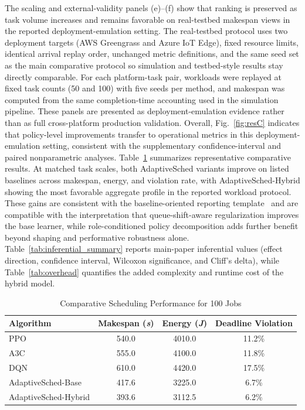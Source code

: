 \documentclass[journal]{IEEEtran}
\begin{document}
The scaling and external-validity panels (e)--(f) show that ranking is preserved as task volume increases and remains favorable on real-testbed makespan views in the reported deployment-emulation setting. The real-testbed protocol uses two deployment targets (AWS Greengrass and Azure IoT Edge), fixed resource limits, identical arrival replay order, unchanged metric definitions, and the same seed set as the main comparative protocol so simulation and testbed-style results stay directly comparable. For each platform-task pair, workloads were replayed at fixed task counts (50 and 100) with five seeds per method, and makespan was computed from the same completion-time accounting used in the simulation pipeline. These panels are presented as deployment-emulation evidence rather than as full cross-platform production validation. Overall, Fig.~\ref{fig:resC} indicates that policy-level improvements transfer to operational metrics in this deployment-emulation setting, consistent with the supplementary confidence-interval and paired nonparametric analyses.
Table~\ref{tab:comparative} summarizes representative comparative results. At matched task scales, both AdaptiveSched variants improve on listed baselines across makespan, energy, and violation rate, with AdaptiveSched-Hybrid showing the most favorable aggregate profile in the reported workload protocol. These gains are consistent with the baseline-oriented reporting template~\cite{zhang2025s41598} and are compatible with the interpretation that queue-shift-aware regularization improves the base learner, while role-conditioned policy decomposition adds further benefit beyond shaping and performative robustness alone. Table~\ref{tab:inferential_summary} reports main-paper inferential values (effect direction, confidence interval, Wilcoxon significance, and Cliff's delta), while Table~\ref{tab:overhead} quantifies the added complexity and runtime cost of the hybrid model.

\begin{table}[t]
\centering
\caption{Comparative Scheduling Performance for 100 Jobs}
\label{tab:comparative}
\footnotesize
\begin{tabular}{@{}lccc@{}}
\toprule
\textbf{Algorithm} & \textbf{Makespan (\textit{s})} & \textbf{Energy (\textit{J})} & \textbf{Deadline Violation} \\
\midrule
PPO & 540.0 & 4010.0 & 11.2\% \\
A3C & 555.0 & 4100.0 & 11.8\% \\
DQN & 610.0 & 4420.0 & 17.5\% \\
AdaptiveSched-Base & 417.6 & 3225.0 & 6.7\% \\
AdaptiveSched-Hybrid & 393.6 & 3112.5 & 6.2\% \\
\bottomrule
\end{tabular}
\end{table}
\end{document}
